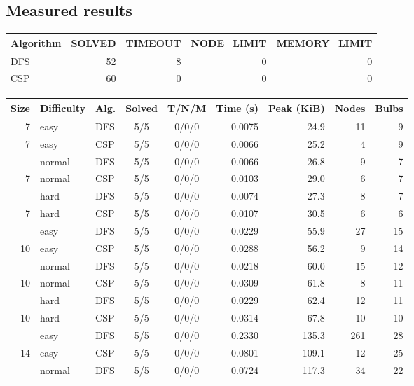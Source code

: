\subsection{Measured results}
\begin{center}\small
\begin{tabular}{@{}lrrrr@{}}
\toprule
Algorithm & SOLVED & TIMEOUT & NODE\_LIMIT & MEMORY\_LIMIT\\
\midrule
DFS & 52 & 8 & 0 & 0\\
CSP & 60 & 0 & 0 & 0\\
\bottomrule
\end{tabular}
\end{center}
\begin{table}[htbp]
\centering\scriptsize
\setlength{\tabcolsep}{4pt}
\begin{tabular}{@{}rllccrrrr@{}}
\toprule
Size & Difficulty & Alg. & Solved & T/N/M & Time (s) & Peak (KiB) & Nodes & Bulbs\\
\midrule
7 & easy & DFS & 5/5 & 0/0/0 & 0.0075 & 24.9 & 11 & 9\\
7 & easy & CSP & 5/5 & 0/0/0 & 0.0066 & 25.2 & 4 & 9\\
\addlinespace[2pt]
7 & normal & DFS & 5/5 & 0/0/0 & 0.0066 & 26.8 & 9 & 7\\
7 & normal & CSP & 5/5 & 0/0/0 & 0.0103 & 29.0 & 6 & 7\\
\addlinespace[2pt]
7 & hard & DFS & 5/5 & 0/0/0 & 0.0074 & 27.3 & 8 & 7\\
7 & hard & CSP & 5/5 & 0/0/0 & 0.0107 & 30.5 & 6 & 6\\
\addlinespace[2pt]
10 & easy & DFS & 5/5 & 0/0/0 & 0.0229 & 55.9 & 27 & 15\\
10 & easy & CSP & 5/5 & 0/0/0 & 0.0288 & 56.2 & 9 & 14\\
\addlinespace[2pt]
10 & normal & DFS & 5/5 & 0/0/0 & 0.0218 & 60.0 & 15 & 12\\
10 & normal & CSP & 5/5 & 0/0/0 & 0.0309 & 61.8 & 8 & 11\\
\addlinespace[2pt]
10 & hard & DFS & 5/5 & 0/0/0 & 0.0229 & 62.4 & 12 & 11\\
10 & hard & CSP & 5/5 & 0/0/0 & 0.0314 & 67.8 & 10 & 10\\
\addlinespace[2pt]
14 & easy & DFS & 5/5 & 0/0/0 & 0.2330 & 135.3 & 261 & 28\\
14 & easy & CSP & 5/5 & 0/0/0 & 0.0801 & 109.1 & 12 & 25\\
\addlinespace[2pt]
14 & normal & DFS & 5/5 & 0/0/0 & 0.0724 & 117.3 & 34 & 22\\

\end{tabular}
\end{table}
